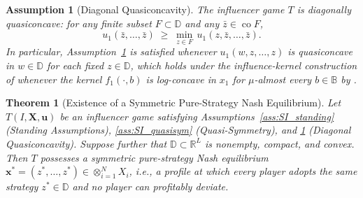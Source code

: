 \documentclass{article}
\newtheorem{theorem}{Theorem}[section]
\newtheorem{assumption}{Assumption}
\begin{document}
    \begin{assumption}[Diagonal Quasiconcavity]\label{ass:SI_diagqc}
        The influencer game $T$ is diagonally quasiconcave: for any
        finite subset $F \subset \mathbb{D}$ and any $\bar{z} \in \operatorname{co} F$,
        \[
            u_1(\bar{z}, \ldots, \bar{z})
            \;\geq\;
            \min_{z \in F}\, u_1(z, \bar{z}, \ldots, \bar{z}).
        \]
        In particular, Assumption~\ref{ass:SI_diagqc} is satisfied whenever
        $u_1(w, z, \ldots, z)$ is quasiconcave in $w \in \mathbb{D}$ for each
        fixed $z \in \mathbb{D}$, which holds under the influence-kernel
        construction of  whenever the kernel
        $f_1(\cdot, b)$ is log-concave in $x_1$ for $\mu$-almost every $b \in \mathbb{B}$
        by .
    \end{assumption}


    \begin{theorem}[Existence of a Symmetric Pure-Strategy Nash Equilibrium]\label{thm:SI_sym_Nash}
        Let $T(I, \mathbf{X}, \mathbf{u})$ be an influencer game satisfying
        Assumptions~\ref{ass:SI_standing} (Standing Assumptions),
        \ref{ass:SI_quasisym} (Quasi-Symmetry), and
        \ref{ass:SI_diagqc} (Diagonal Quasiconcavity).
        Suppose further that $\mathbb{D} \subset \mathbb{R}^L$ is nonempty,
        compact, and convex.  Then $T$ possesses a
        symmetric pure-strategy Nash equilibrium
        $\mathbf{x}^{*} = (z^{*}, \ldots, z^{*}) \in \otimes_{i=1}^N X_i$, i.e., a
        profile at which every player adopts the same strategy
        $z^{*} \in \mathbb{D}$ and no player can profitably deviate.
    \end{theorem}
\end{document}
